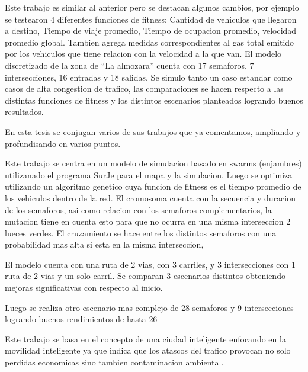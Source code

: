 \begin{itemize}
	\begin{item}
Este trabajo es similar al anterior pero se destacan algunos cambios, por ejemplo se testearon 4 diferentes funciones de fitness: Cantidad de vehiculos que llegaron a destino, Tiempo de viaje promedio, Tiempo de ocupacion promedio, velocidad promedio global.
Tambien agrega medidas correspondientes al gas total emitido por los vehiculos que tiene relacion con la velocidad a la que van.
El modelo discretizado de la zona de “La almozara” cuenta con 17 semaforos, 7 intersecciones, 16 entradas y 18 salidas.
Se simulo tanto un caso estandar como casos de alta congestion de trafico, las comparaciones se hacen respecto a las distintas funciones de fitness y los distintos escenarios planteados logrando buenos resultados.
	
	\end{item}
	
	\begin{item}
		\bibentry{Sanchez2007}
En esta tesis se conjugan varios de sus trabajos que ya comentamos, ampliando y profundisando en varios puntos.	
	\end{item}	

	\begin{item}
		\bibentry{Penner2002}
Este trabajo se centra en un modelo de simulacion basado en swarms (enjambres) utilizanado el programa SurJe para el mapa y la simulacion. Luego se optimiza utilizando un algoritmo genetico cuya funcion de fitness es el tiempo promedio de los vehiculos dentro de la red. El cromosoma cuenta con la secuencia y duracion de los semaforos, asi como relacion con los semaforos complementarios, la mutacion tiene en cuenta esto para que no ocurra en una misma interseccion 2 lueces verdes. El cruzamiento se hace entre los distintos semaforos con una probabilidad mas alta si esta en la misma interseccion,

El modelo cuenta con una ruta de 2 vias, con 3 carriles, y 3 intersecciones con 1 ruta de 2 vias y un solo carril.
Se comparan 3 escenarios distintos obteniendo mejoras significativas con respecto al inicio.

Luego se realiza otro escenario mas complejo de 28 semaforos  y 9 intersecciones logrando buenos rendimientos de hasta 26%
	\end{item}	
	
	
	\begin{item}
		\bibentry{Stolfi2012}
Este trabajo se basa en el concepto de una ciudad inteligente enfocando en la movilidad inteligente ya que indica que los atascos del trafico provocan no solo perdidas economicas sino tambien contaminacion ambiental.


\end{item}
\end{itemize}

